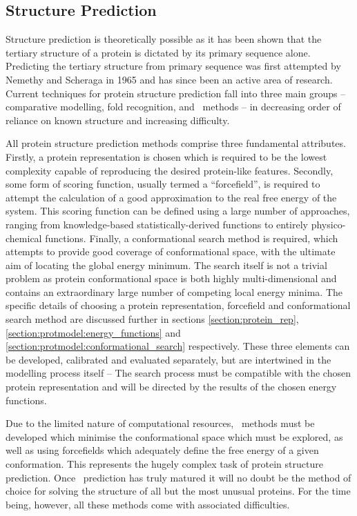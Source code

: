 \subsection{Structure Prediction}

Structure prediction is theoretically possible as it has been shown that the tertiary structure of a protein is dictated by its primary sequence alone\cite{NATIVE:Anfinsen1973}.
Predicting the tertiary structure from primary sequence was first attempted by Nemethy and Scheraga in 1965\cite{COMPCHEM:Nem65} and has since been an active area of research. Current techniques for protein structure prediction fall into three main groups -- comparative modelling, fold recognition, and \abinitio\ methods -- in decreasing order of reliance on known structure and increasing difficulty.

All protein structure prediction methods comprise three fundamental attributes. Firstly, a protein representation
is chosen which is required to be the  lowest complexity capable of reproducing the desired protein-like features. Secondly, some form of scoring function,
usually termed a ``forcefield'', is required to attempt the calculation of a good approximation to the real free energy of the system. This scoring function can be defined using a large number of approaches, ranging from knowledge-based statistically-derived functions to entirely physico-chemical functions. Finally, a conformational search method is required, which attempts to provide good coverage of conformational space, with the ultimate aim of locating the global energy minimum. The search itself is not a trivial problem as protein conformational space is both highly multi-dimensional and contains an extraordinary large number of competing local energy minima. The specific
details of choosing a protein representation, forcefield and conformational
search method are discussed further in sections \ref{section:protein_rep}, \ref{section:protmodel:energy_functions}
and \ref{section:protmodel:conformational_search} respectively.
These three elements can be developed, calibrated and evaluated separately, but are intertwined in the modelling process itself -- The search process
must be compatible with the chosen protein representation and will be directed by the results of the chosen energy functions.
 
Due to the limited nature of computational resources, \insilico\   methods must be developed which minimise the conformational space which must be explored, as well as using forcefields
which adequately define the  free energy of a given conformation. This represents the hugely complex task of protein structure prediction. Once \insilico\ prediction has truly matured it will no doubt be the method of choice for solving
the structure of all but the most unusual proteins. For the time being, however, all these methods come with associated difficulties. 


